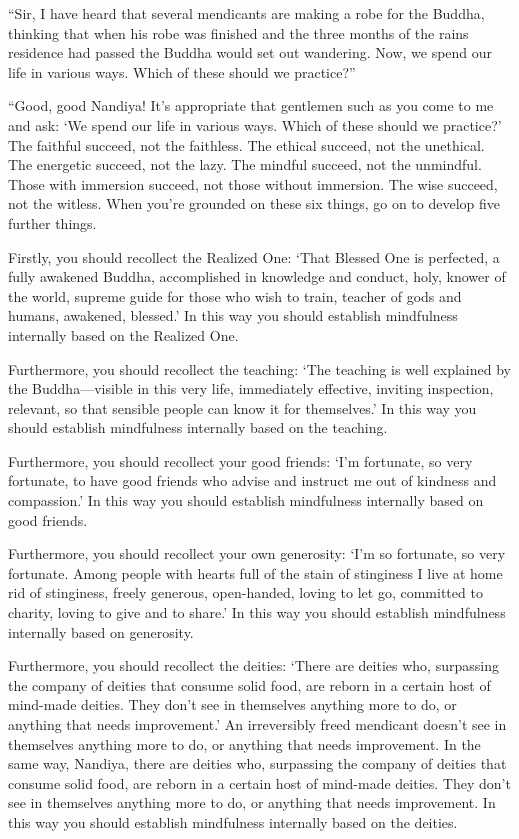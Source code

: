 \documentclass[12pt,openany]{book}%
\begin{document}
“Sir, I have heard that several mendicants are making a robe for the Buddha, thinking that when his robe was finished and the three months of the rains residence had passed the Buddha would set out wandering. Now, we spend our life in various ways. Which of these should we practice?” 

“Good, good Nandiya! It’s appropriate that gentlemen such as you come to me and ask: ‘We spend our life in various ways. Which of these should we practice?’ The faithful succeed, not the faithless. The ethical succeed, not the unethical. The energetic succeed, not the lazy. The mindful succeed, not the unmindful. Those with immersion succeed, not those without immersion. The wise succeed, not the witless. When you’re grounded on these six things, go on to develop five further things. 

Firstly, you should recollect the Realized One: ‘That Blessed One is perfected, a fully awakened Buddha, accomplished in knowledge and conduct, holy, knower of the world, supreme guide for those who wish to train, teacher of gods and humans, awakened, blessed.’ In this way you should establish mindfulness internally based on the Realized One. 

Furthermore, you should recollect the teaching: ‘The teaching is well explained by the Buddha—visible in this very life, immediately effective, inviting inspection, relevant, so that sensible people can know it for themselves.’ In this way you should establish mindfulness internally based on the teaching. 

Furthermore, you should recollect your good friends: ‘I’m fortunate, so very fortunate, to have good friends who advise and instruct me out of kindness and compassion.’ In this way you should establish mindfulness internally based on good friends. 

Furthermore, you should recollect your own generosity: ‘I’m so fortunate, so very fortunate. Among people with hearts full of the stain of stinginess I live at home rid of stinginess, freely generous, open-handed, loving to let go, committed to charity, loving to give and to share.’ In this way you should establish mindfulness internally based on generosity. 

Furthermore, you should recollect the deities: ‘There are deities who, surpassing the company of deities that consume solid food, are reborn in a certain host of mind-made deities. They don’t see in themselves anything more to do, or anything that needs improvement.’ An irreversibly freed mendicant doesn’t see in themselves anything more to do, or anything that needs improvement. In the same way, Nandiya, there are deities who, surpassing the company of deities that consume solid food, are reborn in a certain host of mind-made deities. They don’t see in themselves anything more to do, or anything that needs improvement. In this way you should establish mindfulness internally based on the deities. 
\end{document}
